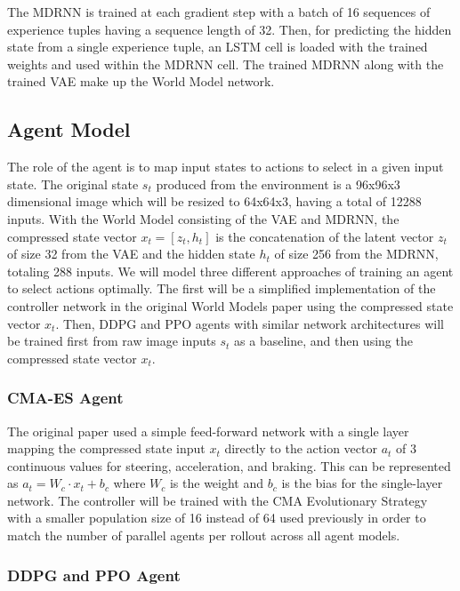 The MDRNN is trained at each gradient step with a batch of 16 sequences of experience tuples having a sequence length of 32. Then, for predicting the hidden state from a single experience tuple, an LSTM cell is loaded with the trained weights and used within the MDRNN cell. The trained MDRNN along with the trained VAE make up the World Model network.

\subsection{Agent Model}

The role of the agent is to map input states to actions to select in a given input state. The original state $s_t$ produced from the environment is a 96x96x3 dimensional image which will be resized to 64x64x3, having a total of 12288 inputs. With the World Model consisting of the VAE and MDRNN, the compressed state vector $x_t = [z_t, h_t]$ is the concatenation of the latent vector $z_t$ of size 32 from the VAE and the hidden state $h_t$ of size 256 from the MDRNN, totaling 288 inputs. We will model three different approaches of training an agent to select actions optimally. The first will be a simplified implementation of the controller network in the original World Models paper \cite{1.0.0} using the compressed state vector $x_t$. Then, DDPG and PPO agents with similar network architectures will be trained first from raw image inputs $s_t$ as a baseline, and then using the compressed state vector $x_t$.

\subsubsection{CMA-ES Agent}

The original paper used a simple feed-forward network with a single layer mapping the compressed state input $x_t$ directly to the action vector $a_t$ of 3 continuous values for steering, acceleration, and braking. This can be represented as $a_t = W_c \cdot x_t + b_c$ where $W_c$ is the weight and $b_c$ is the bias for the single-layer network. The controller will be trained with the CMA Evolutionary Strategy with a smaller population size of 16 instead of 64 used previously in order to match the number of parallel agents per rollout across all agent models.

\subsubsection{DDPG and PPO Agent}

